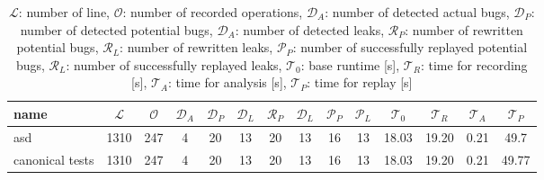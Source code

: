 \begin{table}[h]
\begin{tabular}{|l|c|c|c|c|c|c|c|c|c|c|c|c|c|}
\hline
name  & $\mathcal{L}$ & $\mathcal{O}$ & $\mathcal{D}_A$ & $\mathcal{D}_P$ & $\mathcal{D}_L$ & $\mathcal{R}_P$ & $\mathcal{D}_L$ & $\mathcal{P}_P$ & $\mathcal{P}_L$ & $\mathcal{T}_0$ & $\mathcal{T}_R$ & $\mathcal{T}_A$ & $\mathcal{T}_P$ \\ \hline
asd & 1310 & 247 & 4 & 20 & 13 & 20 & 13 & 16 & 13 & 18.03 & 19.20 & 0.21 & 49.7 \\ \hline
canonical tests & 1310 & 247 & 4 & 20 & 13 & 20 & 13 & 16 & 13 & 18.03 & 19.20 & 0.21 & 49.77 \\ \hline
\end{tabular}
\caption{$\mathcal{L}$: number of line, $\mathcal{O}$: number of recorded operations, $\mathcal{D}_A$: number of detected actual bugs, $\mathcal{D}_P$: number of detected potential bugs, $\mathcal{D}_A$: number of detected leaks, $\mathcal{R}_P$: number of rewritten potential bugs, $\mathcal{R}_L$: number of rewritten leaks, $\mathcal{P}_P$: number of successfully replayed potential bugs, $\mathcal{R}_L$: number of successfully replayed leaks, $\mathcal{T}_0$: base runtime [s], $\mathcal{T}_R$: time for recording [s], $\mathcal{T}_A$: time for analysis [s], $\mathcal{T}_P$: time for replay [s]}
\label{}
\end{table}